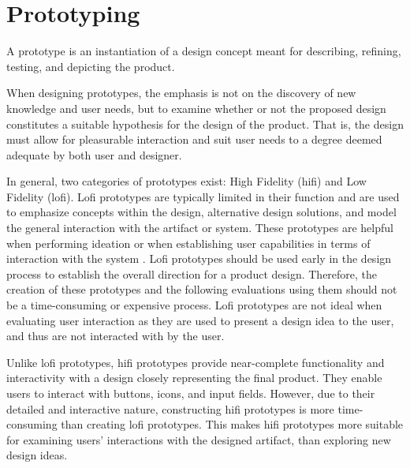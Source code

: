 \section{Prototyping} %
A prototype is an instantiation of a design concept meant for describing, refining, testing, and depicting the product.\cite{BUXTON2007139_prototyping}

When designing prototypes, the emphasis is not on the discovery of new knowledge and user needs, but to examine whether or not the proposed design constitutes a suitable hypothesis for the design of the product\cite{nielsen-norman-prototype-low-vs-high,BUXTON2007139_prototyping}.
That is, the design must allow for pleasurable interaction and suit user needs to a degree deemed adequate by both user and designer.

In general, two categories of prototypes exist: High Fidelity (hifi) and Low Fidelity (lofi).
Lofi prototypes are typically limited in their function and are used to emphasize concepts within the design, alternative design solutions, and model the general interaction with the artifact or system\cite{low-vs-high-fidelity-prototype}.
These prototypes are helpful when performing ideation\cite{nielsen-norman-ideation} or when establishing user capabilities in terms of interaction with the system \cite{usefullness-of-different-prototypes,low-vs-high-fidelity-prototype}.
Lofi prototypes should be used early in the design process to establish the overall direction for a product design. 
Therefore, the creation of these prototypes and the following evaluations using them should not be a time-consuming or expensive process. \cite{usefullness-of-different-prototypes,low-vs-high-fidelity-prototype} 
Lofi prototypes are not ideal when evaluating user interaction as they are used to present a design idea to the user, and thus are not interacted with by the user\cite{low-vs-high-fidelity-prototype}.

Unlike lofi prototypes, hifi prototypes provide near-complete functionality and interactivity with a design closely representing the final product.
They enable users to interact with buttons, icons, and input fields.
However, due to their detailed and interactive nature, constructing hifi prototypes is more time-consuming than creating lofi prototypes. 
This makes hifi prototypes more suitable for examining users' interactions with the designed artifact, than exploring new design ideas. \cite{nielsen-norman-prototype-low-vs-high,low-vs-high-fidelity-prototype}

